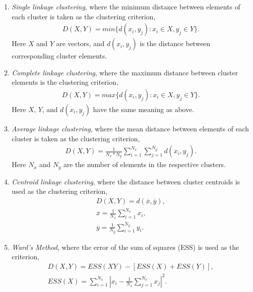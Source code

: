\begin{enumerate}
\item{ \textit{Single linkage  clustering}, where the minimum distance
  between elements of each cluster is taken as the clustering criterion,
\begin{gather}
D(X, Y)=min\{d(x_i, y_j): x_i \in X, y_j \in Y \}.
\end{gather}
Here  $X$ and  $Y$ are  vectors, and  $d(x_i, y_j)$  is  the distance
between corresponding cluster elements.}

\item{  \textit{Complete   linkage  clustering},  where   the  maximum
  distance between cluster elements is the clustering criterion,
\begin{gather}
D(X, Y)=max\{d(x_i, y_j): x_i \in X, y_j \in Y \}.
\end{gather} }
Here $X$, $Y$, and $d(x_{i},y_{j})$ have the same meaning as above.
  
\item{  \textit{Average linkage clustering},  where the  mean distance
  between  elements  of  each  cluster  is  taken  as  the  clustering
  criterion,
\begin{gather}
D(X, Y)=\frac{1}{N_x  * N_y} \sum_{i=1}^{N_x}  \sum_{j=1}^{N_y} d(x_i,
y_j).
\end{gather}
Here $N_x$ and $N_y$ are the number of elements in the respective
clusters.  }

\item{ \textit{Centroid linkage clustering}, where the distance between
  cluster centroids is used as the clustering criterion,
\begin{gather}
D(X, Y)=d(\overline{x}, \overline{y}) ,\\
\overline{x} = \frac{1}{N_x} \sum_{i=1}^{N_x} x_i ,\\
\overline{y} = \frac{1}{N_y} \sum_{i=1}^{N_y} y_i.
\end{gather} }

\item{ \textit{Ward's Method},  where the error of the  sum of squares
  (ESS) is used as the criterion,
\begin{gather}
D(X,Y)=ESS(XY) -[ESS(X) + ESS(Y)] ,\\
ESS(X)=  \sum_{i=1}^{N_x} \left|
x_i -\frac{1}{N_x}\sum_{j=1}^{N_x} x_j\right|^2 .
\end{gather} }
\end{enumerate}


